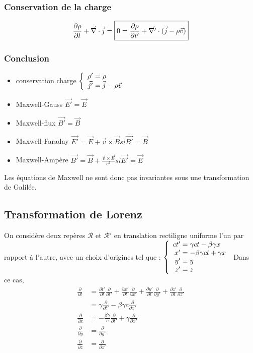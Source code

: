 \subsubsection*{Conservation de la charge}
\begin{align*}
	\frac{\partial\rho}{\partial t}+\vec{\nabla}\cdot\vec{j}=\boxed{0=\frac{\partial\rho}{\partial t'}+\vec{\nabla '}\cdot(\vec{j}-\rho\vec{v})}
\end{align*}

\subsubsection*{Conclusion}
\begin{itemize}
	\item conservation charge $\left\{ \begin{array}{r@{\;}l}
					\rho '&=\rho\\
					\vec{j'}&=\vec{j}-\rho\vec{v}
			\end{array} \right.$
	\item Maxwell-Gauss $\vec{E '}=\vec{E}$
	\item Maxwell-flux $\vec{B '}=\vec{B}$
	\item Maxwell-Faraday $\vec{E '}=\vec{E}+\vec{v}\times\vec{B} si \vec{B'}=\vec{B}$
	\item Maxwell-Ampère $\vec{B '}=\vec{B}+\frac{\vec{v}\times\vec{E}}{c^2} si \vec{E'}=\vec{E}$
\end{itemize}

Les équations de Maxwell ne sont donc pas invariantes sous une transformation de Galilée.

\subsection{Transformation de Lorenz}
On considère deux repères $\mathcal{R}$ et $\mathcal{R}'$ en translation rectiligne uniforme l'un par rapport à l'autre, avec un choix d'origines tel que :
$\left\{ \begin{array}{r@{\;}l}
		ct'&=\gamma ct-\beta\gamma x\\
		x'&=-\beta\gamma ct+\gamma x\\
		y'&=y\\
		z'&=z
\end{array} \right.$
Dans ce cas,
\begin{align*}
	\frac{\partial}{\partial t}&=\frac{\partial t'}{\partial t} \frac{\partial}{\partial t'}
			+\frac{\partial x'}{\partial t} \frac{\partial}{\partial x'}
			+\frac{\partial y'}{\partial t} \frac{\partial}{\partial y'}
			+\frac{\partial z'}{\partial t} \frac{\partial}{\partial z'}\\
		&=\gamma\frac{\partial}{\partial t'}-\beta\gamma c\frac{\partial}{\partial x'}\\[10pt]
	\frac{\partial}{\partial x}&=-\frac{\beta\gamma}{c}\frac{\partial}{\partial t'}+\gamma\frac{\partial}{\partial x'}\\
	\frac{\partial}{\partial y}&=\frac{\partial}{\partial y'}\\
	\frac{\partial}{\partial z}&=\frac{\partial}{\partial z'}
\end{align*}

